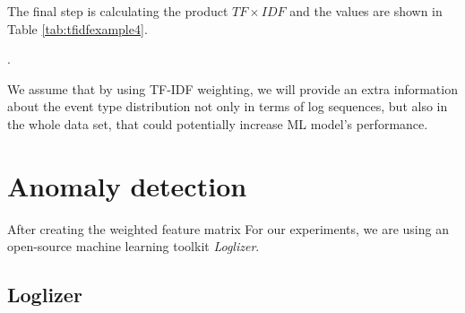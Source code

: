 The final step is calculating the product $TF \times IDF$ and the values are shown in Table \ref{tab:tfidfexample4}.

\begin{table}[!h]
    \centering
    \caption{TF and IDF scores from the example are multiplied to obtain TF-IDF}.
    \label{tab:tfidfexample4}
\end{table}

We assume that by using TF-IDF weighting, we will provide an extra information about the event type distribution not only in terms of log sequences, but also in the whole data set, that could potentially increase ML model's performance. 

\section{Anomaly detection}

After creating the weighted feature matrix 
For our experiments, we are using an open-source machine learning toolkit \textit{Loglizer}. 

\subsection{Loglizer}
\label{subscetion:loglizer}

